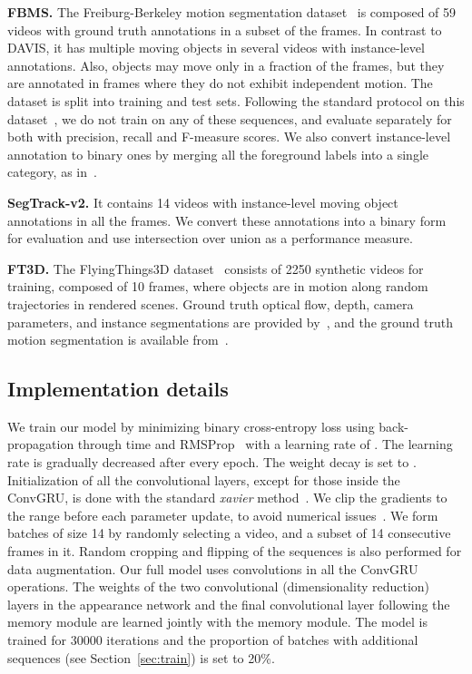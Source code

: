 \documentclass[10pt,twocolumn,letterpaper]{article}
\begin{document}
\vspace{0.3cm}\noindent\textbf{FBMS.}
The Freiburg-Berkeley motion segmentation dataset~\cite{ochs2014segmentation}
is composed of 59 videos with ground truth annotations in a subset of the
frames. In contrast to DAVIS, it has multiple moving objects in several videos
with instance-level annotations. Also, objects may move only in a fraction of
the frames, but they are annotated in frames where they do not exhibit
independent motion. The dataset is split into training and test sets. 
Following the standard protocol on this dataset~\cite{keuper2015motion}, we do
not train on any of these sequences, and evaluate separately for both
with precision, recall and F-measure scores. We also convert
instance-level annotation to binary ones by merging all the foreground
labels into a single category, as in~\cite{taylor2015causal}.

\vspace{0.3cm}\noindent\textbf{SegTrack-v2.}
It contains 14 videos with instance-level moving object annotations in all the
frames. We convert these annotations into a binary form for evaluation and use
intersection over union as a performance measure.

\vspace{0.3cm}\noindent\textbf{FT3D.}
The FlyingThings3D dataset~\cite{Mayer16} consists of 2250 synthetic videos for
training, composed of 10 frames, where objects are in motion along random
trajectories in rendered scenes. Ground truth optical flow, depth, camera
parameters, and instance segmentations are provided by~\cite{Mayer16}, and the
ground truth motion segmentation is available from~\cite{tokmakov2016web}.

\subsection{Implementation details}
\label{sec:implement}
We train our model by minimizing binary cross-entropy loss using
back-propagation through time and RMSProp~\cite{rmsprop} with a learning rate
of . The learning rate is gradually decreased after every epoch. The
weight decay is set to . Initialization of all the convolutional layers,
except for those inside the ConvGRU, is done with the standard \textit{xavier}
method~\cite{glorot2010understanding}. We clip the gradients to the 
range before each parameter update, to avoid numerical
issues~\cite{graves2013generating}. We form batches of size 14 by randomly
selecting a video, and a subset of 14 consecutive frames in it. Random cropping
and flipping of the sequences is also performed for data augmentation. Our full
model uses  convolutions in all the ConvGRU operations. The weights
of the two  convolutional (dimensionality reduction) layers in the
appearance network and the final  convolutional layer following the
memory module are learned jointly with the memory module. The model is trained
for 30000 iterations and the proportion of batches with additional sequences
(see Section~\ref{sec:train}) is set to 20\%.
\end{document}
